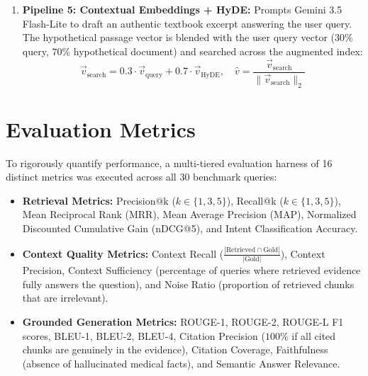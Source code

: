 \documentclass[11pt,a4paper]{article}
\begin{document}
\begin{enumerate}[leftmargin=1.8em, itemsep=0.3em]
    \item \textbf{Pipeline 5: Contextual Embeddings + HyDE:}
    Prompts Gemini 3.5 Flash-Lite to draft an authentic textbook excerpt answering the user query. The hypothetical passage vector is blended with the user query vector ($30\%$ query, $70\%$ hypothetical document) and searched across the augmented index:
    \begin{equation}
        \vec{v}_{\text{search}} = 0.3 \cdot \vec{v}_{\text{query}} + 0.7 \cdot \vec{v}_{\text{HyDE}}, \quad \hat{v} = \frac{\vec{v}_{\text{search}}}{\|\vec{v}_{\text{search}}\|_2}
    \end{equation}
\end{enumerate}

\section{Evaluation Metrics}
To rigorously quantify performance, a multi-tiered evaluation harness of 16 distinct metrics was executed across all 30 benchmark queries:
\begin{itemize}[leftmargin=1.8em, itemsep=0.2em]
    \item \textbf{Retrieval Metrics:} Precision@k ($k \in \{1, 3, 5\}$), Recall@k ($k \in \{1, 3, 5\}$), Mean Reciprocal Rank (MRR), Mean Average Precision (MAP), Normalized Discounted Cumulative Gain (nDCG@5), and Intent Classification Accuracy.
    \item \textbf{Context Quality Metrics:} Context Recall ($\frac{|\text{Retrieved} \cap \text{Gold}|}{|\text{Gold}|}$), Context Precision, Context Sufficiency (percentage of queries where retrieved evidence fully answers the question), and Noise Ratio (proportion of retrieved chunks that are irrelevant).
    \item \textbf{Grounded Generation Metrics:} ROUGE-1, ROUGE-2, ROUGE-L F1 scores, BLEU-1, BLEU-2, BLEU-4, Citation Precision ($100\%$ if all cited chunks are genuinely in the evidence), Citation Coverage, Faithfulness (absence of hallucinated medical facts), and Semantic Answer Relevance.
\end{itemize}

\end{document}
